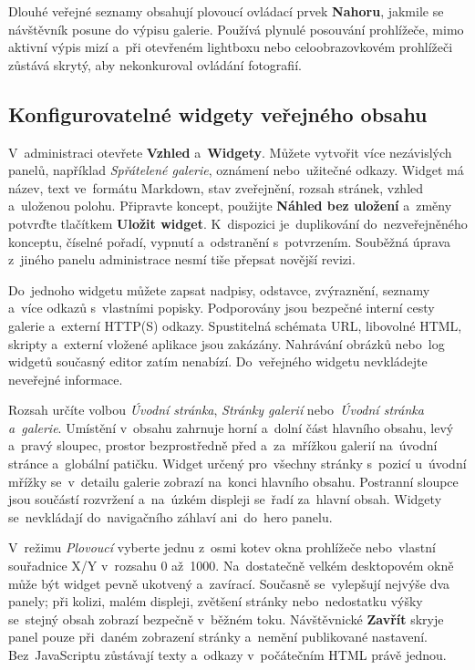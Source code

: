 \documentclass[11pt,a4paper]{article}
\newcommand{\ui}[1]{\textbf{#1}}
\begin{document}
Dlouhé veřejné seznamy obsahují plovoucí ovládací prvek \ui{Nahoru}, jakmile se
návštěvník posune do výpisu galerie. Používá plynulé posouvání prohlížeče, mimo
aktivní výpis mizí a~při otevřeném lightboxu nebo celoobrazovkovém prohlížeči
zůstává skrytý, aby nekonkuroval ovládání fotografií.

\subsection{Konfigurovatelné widgety veřejného obsahu}

V~administraci otevřete \ui{Vzhled} a~\ui{Widgety}. Můžete vytvořit více
nezávislých panelů, například \emph{Spřátelené galerie}, oznámení nebo~užitečné
odkazy. Widget má název, text ve~formátu Markdown, stav zveřejnění, rozsah
stránek, vzhled a~uloženou polohu. Připravte koncept, použijte \ui{Náhled bez
uložení} a~změny potvrďte tlačítkem \ui{Uložit widget}. K~dispozici
je~duplikování do~nezveřejněného konceptu, číselné pořadí, vypnutí a~odstranění
s~potvrzením. Souběžná úprava z~jiného panelu administrace nesmí tiše přepsat
novější revizi.

Do~jednoho widgetu můžete zapsat nadpisy, odstavce, zvýraznění, seznamy a~více
odkazů s~vlastními popisky. Podporovány jsou bezpečné interní cesty galerie
a~externí HTTP(S) odkazy. Spustitelná schémata URL, libovolné HTML, skripty
a~externí vložené aplikace jsou zakázány. Nahrávání obrázků nebo~log widgetů
současný editor zatím nenabízí. Do~veřejného widgetu nevkládejte neveřejné
informace.

Rozsah určíte volbou \emph{Úvodní stránka}, \emph{Stránky galerií}
nebo~\emph{Úvodní stránka a~galerie}. Umístění v~obsahu zahrnuje horní a~dolní
část hlavního obsahu, levý a~pravý sloupec, prostor bezprostředně před
a~za~mřížkou galerií na~úvodní stránce a~globální patičku. Widget určený
pro~všechny stránky s~pozicí u~úvodní mřížky se~v~detailu galerie zobrazí
na~konci hlavního obsahu. Postranní sloupce jsou součástí rozvržení a~na~úzkém
displeji se~řadí za~hlavní obsah. Widgety se~nevkládají do~navigačního záhlaví
ani~do~hero panelu.

V~režimu \emph{Plovoucí} vyberte jednu z~osmi kotev okna prohlížeče nebo~vlastní
souřadnice X/Y v~rozsahu 0 až~1000. Na~dostatečně velkém desktopovém okně může
být widget pevně ukotvený a~zavírací. Současně se~vylepšují nejvýše dva panely;
při kolizi, malém displeji, zvětšení stránky nebo~nedostatku výšky se~stejný
obsah zobrazí bezpečně v~běžném toku. Návštěvnické \ui{Zavřít} skryje panel
pouze při~daném zobrazení stránky a~nemění publikované nastavení.
Bez~JavaScriptu zůstávají texty a~odkazy v~počátečním HTML právě jednou.
\end{document}
